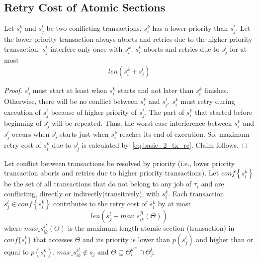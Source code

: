 \subsection{Retry Cost of Atomic Sections}
%
\begin{clm}\label{clm:basic_2_tx_rc}
Let $s_i^k$ and $s_j^l$ be two conflicting transactions. $s_i^k$ has a lower priority than $s_j^l$. Let the lower priority transaction always aborts and retries due to the higher priority transaction. $s_j^l$ interfere only once with $s_i^k$. $s_i^k$ aborts and retries due to $s_j^l$ for at most
%
\begin{equation}
len\left(s_i^k + s_j^l\right)\label{eq:basic_2_tx_rc}
\end{equation}
%
\end{clm}
%
\begin{proof}
%
$s_j^l$ must start at least when $s_i^k$ starts and not later than $s_i^k$ finishes. Otherwise, there will be no conflict between $s_i^k$ and $s_j^l$. $s_i^k$ must retry during execution of $s_j^l$ because of higher priority of $s_j^l$. The part of $s_i^k$ that started before beginning of $s_j^l$ will be repeated. Thus, the worst case interference between $s_i^k$ and $s_j^l$ occurs when $s_j^l$ starts just when $s_i^k$ reaches its end of execution. So, maximum retry cost of $s_i^k$ due to $s_j^l$ is calculated by~\ref{eq:basic_2_tx_rc}. Claim follows.
%
\end{proof}
%
\begin{clm}\label{clm:effect_one_tx_in_rc_multiple_txs}
%
Let conflict between transactions be resolved by priority (i.e., lower
priority transaction aborts and retries due to higher priority transactions).
Let $conf\left\{ s_{i}^{k}\right\} $ be the set of all transactions
that do not belong to any job of $\tau_{i}$ and are conflicting, directly or indirectly(transitively), with
$s_{i}^{k}$. Each transaction $s_{j}^{l}\in conf\left\{ s_{i}^{k}\right\} $
contributes to the retry cost of $s_{i}^{k}$ by at most 
\begin{equation}
len\left(s_{j}^{l}+max\_s_{ik}^{jl}(\Theta)\right)\label{eq:effect_one_tx_in_rc_multiple_txs}
\end{equation}
where $max\_s_{ik}^{jl}(\Theta)$ is the maximum length atomic section
(transaction) in $conf\{s_{i}^{k}\}$ that accesses $\Theta$ and its priority
is lower than $p(s_{j}^{l})$ and higher than or equal to $p(s_{i}^{k})$. $max\_s_{ik}^{jl} \not\in s_{j}$
and $\Theta\subseteq\Theta_{i}^{k^{ex}}\cap\Theta_{j}^{l}$.
%
\end{clm}
%

